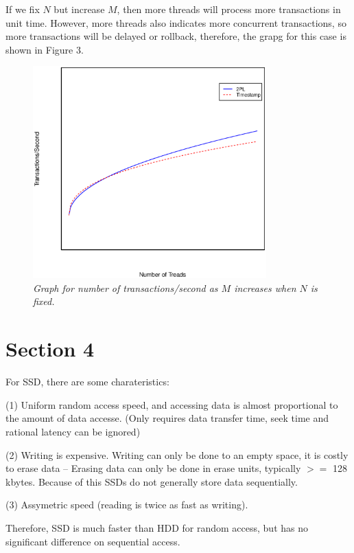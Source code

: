 \documentclass{article}
\begin{document}
If we fix $N$ but increase $M$, then more threads will process more transactions in unit time. However, more threads also indicates more concurrent transactions, so more transactions will be delayed or rollback, therefore, the grapg for this case is shown in Figure 3.

\begin{figure}[htp]
\centering
\includegraphics[width=9cm]{2pl_vs_ts_2.eps}
\caption{\textit{Graph for number of transactions/second as $M$ increases when $N$ is fixed.}}
\end{figure}

\goodbreak

\section{Section 4}

For SSD, there are some charateristics:

\noindent (1) Uniform random access speed, and accessing data is almost proportional to the amount of data accesse. (Only requires data transfer time, seek time and rational latency can be ignored)

\noindent (2) Writing is expensive. Writing can only be done to an empty space, it is costly to erase data – Erasing data can only be done in erase units, typically $>=$ 128 kbytes. Because of this SSDs do not generally store data sequentially.

\noindent (3) Assymetric speed (reading is twice as fast as writing).


Therefore, SSD is much faster than HDD for random access, but has no significant difference on sequential access.
\end{document}
